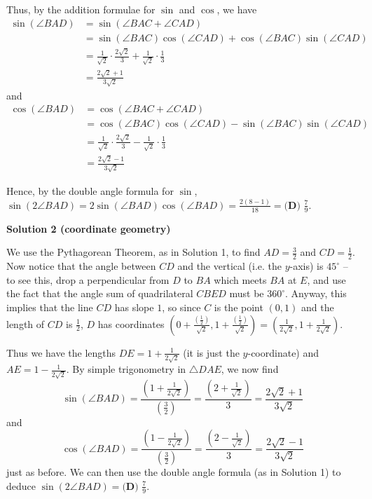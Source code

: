 \begin{enumerate}
 Thus, by the addition formulae for $\sin$ and $\cos$, we have
 \[\begin{split}\sin{\left(\angle BAD\right)}&=\sin{\left(\angle BAC + \angle CAD\right)}\\&=\sin{\left(\angle BAC\right)}\cos{\left(\angle CAD\right)}+\cos{\left(\angle BAC\right)}\sin{\left(\angle CAD\right)}\\&=\frac{1}{\sqrt{2}}\cdot\frac{2 \sqrt{2}}{3} + \frac{1}{\sqrt{2}}\cdot\frac{1}{3} \\ &= \frac{2 \sqrt{2} + 1}{3 \sqrt{2}}\end{split}\]and
 \[\begin{split}\cos{\left(\angle BAD\right)}&=\cos{\left(\angle BAC + \angle CAD\right)}\\&=\cos{\left(\angle BAC\right)}\cos{\left(\angle CAD\right)}-\sin{\left(\angle BAC\right)}\sin{\left(\angle CAD\right)}\\&=\frac{1}{\sqrt{2}}\cdot\frac{2 \sqrt{2}}{3} - \frac{1}{\sqrt{2}}\cdot\frac{1}{3} \\ &= \frac{2 \sqrt{2} - 1}{3 \sqrt{2}}\end{split}\]

 Hence, by the double angle formula for $\sin$, $\sin{\left(2\angle BAD\right)} = 2\sin{\left(\angle BAD\right)}\cos{\left(\angle BAD\right)} = \frac{2(8-1)}{18} = \boxed{\textbf{(D) } \frac{7}{9}}$.

 



\textbf{Solution 2 (coordinate geometry)}

We use the Pythagorean Theorem, as in Solution 1, to find $AD=\frac{3}{2}$ and $CD=\frac{1}{2}$. Now notice that the angle between $CD$ and the vertical (i.e. the $y$-axis) is $45^{\circ}$ – to see this, drop a perpendicular from $D$ to $BA$ which meets $BA$ at $E$, and use the fact that the angle sum of quadrilateral $CBED$ must be $360^{\circ}$. Anyway, this implies that the line $CD$ has slope $1$, so since $C$ is the point $(0,1)$ and the length of $CD$ is $\frac{1}{2}$, $D$ has coordinates $\left(0+\frac{\left(\frac{1}{2}\right)}{\sqrt{2}}, 1+\frac{\left(\frac{1}{2}\right)}{\sqrt{2}}\right) = \left(\frac{1}{2\sqrt{2}}, 1+\frac{1}{2\sqrt{2}}\right)$. 

 Thus we have the lengths $DE=1+\frac{1}{2\sqrt{2}}$ (it is just the $y$-coordinate) and $AE = 1-\frac{1}{2\sqrt{2}}$. By simple trigonometry in $\triangle DAE$, we now find 
 \[\sin{\left(\angle BAD\right)} = \frac{\left(1+\frac{1}{2\sqrt{2}}\right)}{\left(\frac{3}{2}\right)} = \frac{\left(2+\frac{1}{\sqrt{2}}\right)}{3} = \frac{2\sqrt{2}+1}{3\sqrt{2}}\] and 
 \[\cos{\left(\angle BAD\right)} = \frac{\left(1-\frac{1}{2\sqrt{2}}\right)}{\left(\frac{3}{2}\right)} = \frac{\left(2-\frac{1}{\sqrt{2}}\right)}{3} = \frac{2\sqrt{2}-1}{3\sqrt{2}}\] just as before. We can then use the double angle formula (as in Solution 1) to deduce $\sin{\left(2\angle BAD\right)} = \boxed{\textbf{(D) } \frac{7}{9}}$.


\end{enumerate}
